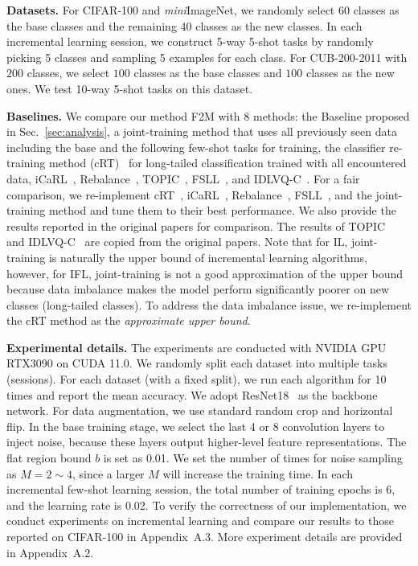 \documentclass{article}
\begin{document}
 
\textbf{Datasets.} For CIFAR-100 and \textit{mini}ImageNet, we randomly select 60 classes as the base classes and the remaining 40 classes as the new classes. In each incremental learning session, we construct 5-way 5-shot tasks by randomly picking 5 classes and sampling 5 examples for each class. For CUB-200-2011 with $200$ classes, we select $100$ classes as the base classes and $100$ classes as the new ones. We test 10-way 5-shot tasks on this dataset. 



\textbf{Baselines.}
We compare our method F2M with 8 methods: the Baseline proposed in Sec.~\ref{sec:analysis}, a joint-training method that uses all previously seen data including the base and the following few-shot tasks for training, the classifier re-training method (cRT)~\cite{cRT} for long-tailed classification trained with all encountered data, iCaRL~\cite{icarl}, Rebalance~\cite{NCM}, TOPIC~\cite{TOPIC}, FSLL~\cite{FSLL}, and IDLVQ-C~\cite{IDLVQC}. For a fair comparison, we re-implement cRT~\cite{cRT}, iCaRL~\cite{icarl}, Rebalance~\cite{NCM}, FSLL~\cite{FSLL}, and the joint-training method and tune them to their best performance. We also provide the results reported in the original papers for comparison. The results of TOPIC~\cite{TOPIC} and IDLVQ-C~\cite{IDLVQC} are copied from the original papers.
Note that for IL, joint-training is naturally the upper bound of incremental learning algorithms, however, for IFL, joint-training is not a good approximation of the upper bound 
because data imbalance makes the model perform significantly poorer on new classes (long-tailed classes).
To address the data imbalance issue, we re-implement 
the cRT method as the \textit{approximate upper bound}. 


\textbf{Experimental details.} The experiments are conducted with NVIDIA GPU RTX3090 on CUDA 11.0. We randomly split each dataset into multiple tasks (sessions). For each dataset (with a fixed split), we run each algorithm for 10 times
and report the mean accuracy.
We adopt ResNet18~\cite{he2016deep} as the backbone network. 
For data augmentation, we use standard random crop and horizontal flip. In the base training stage, we select the last 4 or 8 convolution layers to inject noise, because these layers output higher-level feature representations. The flat region bound $b$ is set as 0.01. We set the number of times for noise sampling as $M= 2\sim4$, since a larger $M$ will increase the training time.
In each incremental few-shot learning session, the total number of training epochs is 6, and the learning rate is 0.02. To verify the correctness of our implementation, we conduct experiments on incremental learning and compare our results to those reported on CIFAR-100 in Appendix~A.3. More experiment details are provided in Appendix~A.2. 
\end{document}
